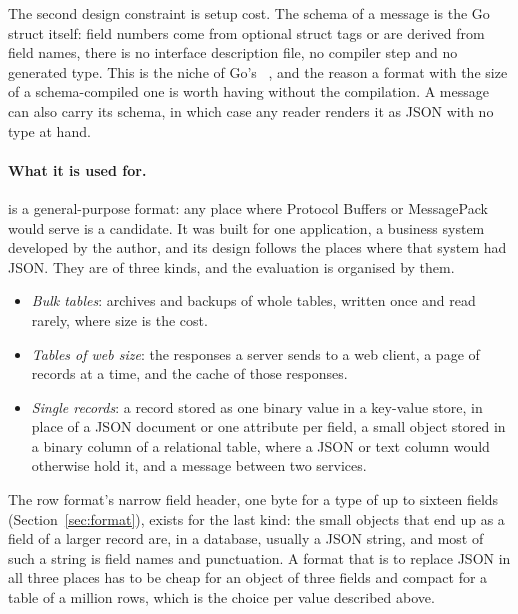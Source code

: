 The second design constraint is setup cost. The schema of a \colbin{} message
is the Go struct itself: field numbers come from optional struct tags or are
derived from field names, there is no interface description file, no compiler
step and no generated type. This is the niche of Go's
~\cite{gob,pike2011gobs}, and the reason a format with the size of a
schema-compiled one is worth having without the compilation. A message can
also carry its schema, in which case any reader renders it as JSON with no
type at hand.

\paragraph{What it is used for.} \colbin{} is a general-purpose format: any
place where Protocol Buffers or MessagePack would serve is a candidate. It
was built for one application, a business system developed by the author,
and its design follows the places where that system had JSON. They are of three kinds, and the
evaluation is organised by them.
\begin{itemize}
\item \emph{Bulk tables}: archives and backups of whole tables, written once
  and read rarely, where size is the cost.
\item \emph{Tables of web size}: the responses a server sends to a web
  client, a page of records at a time, and the cache of those responses.
\item \emph{Single records}: a record stored as one binary value in a
  key-value store, in place of a JSON document or one attribute per field,
  a small object stored in a binary column of a relational table, where a
  JSON or text column would otherwise hold it, and a message between two
  services.
\end{itemize}
The row format's narrow field header, one byte for a type of up to sixteen
fields (Section~\ref{sec:format}), exists for the last kind: the small
objects that end up as a field of a larger record are, in a database,
usually a JSON string, and most of such a string is field names and
punctuation. A format that is to replace JSON in all three places has to
be cheap for an object of three fields and compact for a table of a
million rows, which is the choice per value described above.

